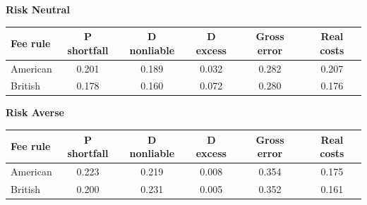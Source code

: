 \documentclass[10pt,border=5pt,varwidth=17cm]{standalone}
\begin{document}
\begingroup
\small
\setlength{\tabcolsep}{5pt}
\renewcommand{\arraystretch}{1.20}
\noindent\textbf{Risk Neutral}\par\smallskip
\noindent\begin{tabularx}{\linewidth}{@{}>{\raggedright\arraybackslash}Xccccc@{}}
\toprule
\textbf{Fee rule} & \textbf{P shortfall} & \textbf{D nonliable} & \textbf{D excess} & \textbf{Gross error} & \textbf{Real costs} \\
\midrule
American & 0.201 & 0.189 & 0.032 & 0.282 & 0.207 \\
British & 0.178 & 0.160 & 0.072 & 0.280 & 0.176 \\
\bottomrule\end{tabularx}\par\medskip
\noindent\textbf{Risk Averse}\par\smallskip
\noindent\begin{tabularx}{\linewidth}{@{}>{\raggedright\arraybackslash}Xccccc@{}}
\toprule
\textbf{Fee rule} & \textbf{P shortfall} & \textbf{D nonliable} & \textbf{D excess} & \textbf{Gross error} & \textbf{Real costs} \\
\midrule
American & 0.223 & 0.219 & 0.008 & 0.354 & 0.175 \\
British & 0.200 & 0.231 & 0.005 & 0.352 & 0.161 \\
\bottomrule\end{tabularx}\par\medskip
\endgroup
\end{document}
